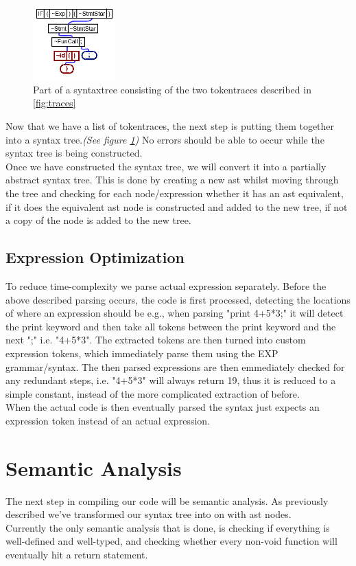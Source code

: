 \documentclass[10pt,a4paper]{article}
\begin{document}
\begin{figure}
\centering
\includegraphics[width=120px]{TokenTree.png}
\caption{Part of a syntaxtree consisting of the two tokentraces described in \ref{fig:traces}}
\label{fig:tracetree}
\end{figure}
Now that we have a list of tokentraces, the next step is putting them together into a syntax tree.\textit{(See figure \ref{fig:tracetree})}
No errors should be able to occur while the syntax tree is being constructed.\\ 
Once we have constructed the syntax tree, we will convert it into a partially abstract syntax tree. This is done by creating a new ast whilst moving through the tree and checking for each node/expression whether it has an ast equivalent, if it does the equivalent ast node is constructed and added to the new tree, if not a copy of the node is added to the new tree.
\subsection{Expression Optimization}
To reduce time-complexity we parse actual expression separately. Before the above described parsing occurs, the code is first processed, detecting the locations of where an expression should be e.g., when parsing "print 4+5*3;" it will detect the print keyword and then take all tokens between the print keyword and the next ";" i.e. "4+5*3". The extracted tokens are then turned into custom expression tokens, which immediately parse them using the EXP grammar/syntax.
The then parsed expressions are then emmediately checked for any redundant steps, i.e. "4+5*3" will always return 19, thus it is reduced to a simple constant, instead of the more complicated extraction of before.\\
When the actual code is then eventually parsed the syntax just expects an expression token instead of an actual expression.


\section{Semantic Analysis}
The next step in compiling our code will be semantic analysis. As previously described we've transformed our syntax tree into on with ast nodes.\\
Currently the only semantic analysis that is done, is checking if everything is well-defined and well-typed, and checking whether every non-void function will eventually hit a return statement.\\
\end{document}
